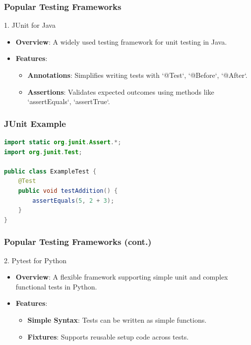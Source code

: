 \documentclass{beamer}
\begin{document}
\begin{frame}
    \frametitle{Popular Testing Frameworks}
    \begin{block}{1. JUnit for Java}
        \begin{itemize}
            \item \textbf{Overview}: A widely used testing framework for unit testing in Java.
            \item \textbf{Features}:
                \begin{itemize}
                    \item \textbf{Annotations}: Simplifies writing tests with `@Test`, `@Before`, `@After`.
                    \item \textbf{Assertions}: Validates expected outcomes using methods like `assertEquals`, `assertTrue`.
                \end{itemize}
        \end{itemize}
    \end{block}
\end{frame}

\begin{frame}[fragile]
    \frametitle{JUnit Example}
    \begin{lstlisting}[language=Java]
import static org.junit.Assert.*;
import org.junit.Test;

public class ExampleTest {
    @Test
    public void testAddition() {
        assertEquals(5, 2 + 3);
    }
}
    \end{lstlisting}
\end{frame}

\begin{frame}
    \frametitle{Popular Testing Frameworks (cont.)}
    \begin{block}{2. Pytest for Python}
        \begin{itemize}
            \item \textbf{Overview}: A flexible framework supporting simple unit and complex functional tests in Python.
            \item \textbf{Features}:
                \begin{itemize}
                    \item \textbf{Simple Syntax}: Tests can be written as simple functions.
                    \item \textbf{Fixtures}: Supports reusable setup code across tests.
                \end{itemize}
        \end{itemize}
    \end{block}
\end{frame}
\end{document}
